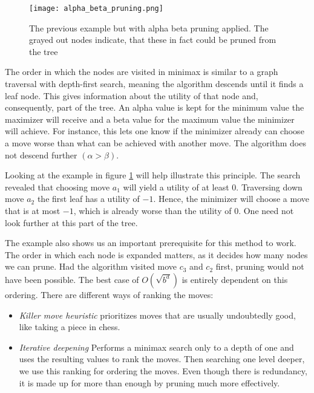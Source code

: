 \begin{figure}
    \centering
    \texttt{[image: alpha\_beta\_pruning.png]}
    \caption{The previous example but with alpha beta pruning applied. The grayed out nodes indicate, that these in fact could be pruned from the tree \cite[cf. p. 308]{russell_artificial_2021}}
    \label{alpha_beta_pruning}
\end{figure}

The order in which the nodes are visited in minimax is similar to a graph traversal with depth-first search, meaning the algorithm descends until it finds a leaf node. This gives information about the utility of that node and, consequently, part of the tree. An alpha value is kept for the minimum value the maximizer will receive and a beta value for the maximum value the minimizer will achieve. For instance, this lets one know if the minimizer already can choose a move worse than what can be achieved with another move. The algorithm does not descend further $ (\alpha > \beta) $.

Looking at the example in figure \ref{alpha_beta_pruning} will help illustrate this principle. The search revealed that choosing move $ a_1 $ will yield a utility of at least $0$. Traversing down move $ a_2 $ the first leaf has a utility of $-1$. Hence, the minimizer will choose a move that is at most $-1$, which is already worse than the utility of $0$. One need not look further at this part of the tree.

The example also shows us an important prerequisite for this method to work. The order in which each node is expanded matters, as it decides how many nodes we can prune. Had the algorithm visited move $ c_3 $ and $ c_2 $ first, pruning would not have been possible. The best case of $ O(\sqrt{b^d}) $ is entirely dependent on this ordering. There are different ways of ranking the moves:

\begin{itemize}
    \item \textit{Killer move heuristic} prioritizes moves that are usually undoubtedly good, like taking a piece in chess.
    \item \textit{Iterative deepening} Performs a minimax search only to a depth of one and uses the resulting values to rank the moves. Then searching one level deeper, we use this ranking for ordering the moves. Even though there is redundancy, it is made up for more than enough by pruning much more effectively.
\end{itemize}

